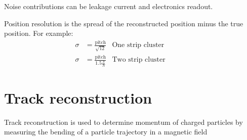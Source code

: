 \documentclass[../../main/main.tex]{subfiles}
\begin{document}
Noise contributions can be leakage current and electronics readout.

Position resolution is the spread of the reconstructed position minus the true position. For example:
\begin{align}
    \sigma &= \frac{\text{pitch}}{\sqrt{12}}       & \text{One strip cluster}&&&& \\
    \sigma &= \frac{\text{pitch}}{1.5 \frac{S}{N}} & \text{Two strip cluster}&&&&
\end{align}





\section{Track reconstruction}
Track reconstruction is used to determine momentum of charged particles by measuring the bending of a particle trajectory in a magnetic field
\end{document}
